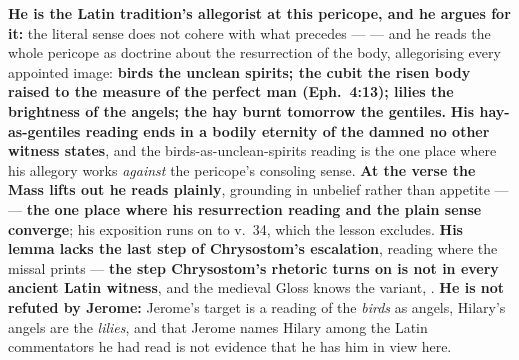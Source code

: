 \begin{witnessnote}
\textbf{He is the Latin tradition's allegorist at this pericope, and he argues
for it:} the literal sense does not cohere with what precedes ---
 --- and
he reads the whole pericope as doctrine about the resurrection of the body,
allegorising every appointed image: \textbf{birds the unclean spirits; the
cubit the risen body raised to the measure of the perfect man (Eph.~4:13);
lilies the brightness of the angels; the hay burnt tomorrow the gentiles.}
\textbf{His hay-as-gentiles reading ends in a bodily eternity of the damned no
other witness states}, and the birds-as-unclean-spirits reading is the one
place where his allegory works \emph{against} the pericope's consoling sense.
\textbf{At the verse the Mass lifts out he reads plainly}, grounding
 in unbelief rather than appetite ---
 --- \textbf{the one
place where his resurrection reading and the plain sense converge}; his
exposition runs on to v.~34, which the lesson excludes. \textbf{His lemma lacks
the last step of Chrysostom's escalation}, reading  where the missal prints  --- \textbf{the step
Chrysostom's rhetoric turns on is not in every ancient Latin witness}, and the
medieval Gloss knows the variant, . \textbf{He is not refuted by Jerome:}
Jerome's target is a reading of the \emph{birds} as angels, Hilary's angels are
the \emph{lilies}, and that Jerome names Hilary among the Latin commentators he
had read is not evidence that he has him in view here.
\end{witnessnote}

